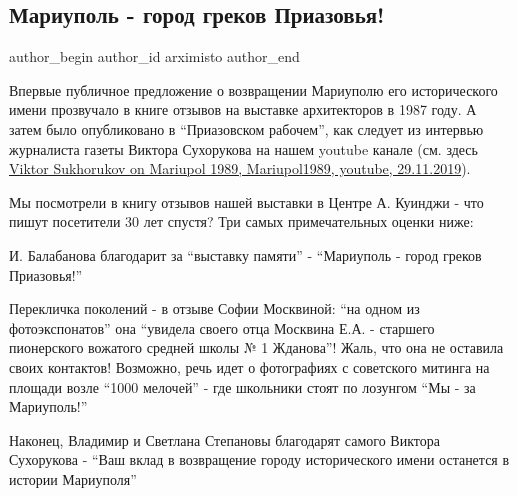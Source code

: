  
 
 
 
 

\subsection{Мариуполь - город греков Приазовья!}
\label{sec:15_12_2019.fb.arximisto.1.mariupol_gorod_grekov_priazovja}

\ifcmt
 author_begin
   author_id arximisto
 author_end
\fi

Впервые публичное предложение о возвращении Мариуполю его исторического имени
прозвучало в книге отзывов на выставке архитекторов в 1987 году. А затем было
опубликовано в \enquote{Приазовском рабочем}, как следует из интервью
журналиста газеты Виктора Сухорукова на нашем youtube канале (см. здесь
\href{https://archive.org/details/video.29_11_2019.mariupol1989.viktor_suhorukov_on_mariupol_1989}{%
Viktor Sukhorukov on Mariupol 1989, Mariupol1989, youtube, 29.11.2019}).

Мы посмотрели в книгу отзывов нашей выставки в Центре А. Куинджи - что пишут
посетители 30 лет спустя? Три самых примечательных оценки ниже:

И. Балабанова благодарит за \enquote{выставку памяти} - \enquote{Мариуполь - город греков Приазовья!}

Перекличка поколений - в отзыве Софии Москвиной: \enquote{на одном из фотоэкспонатов}
она \enquote{увидела своего отца Москвина Е.А. - старшего пионерского вожатого средней
школы № 1 Жданова}! Жаль, что она не оставила своих контактов! Возможно, речь
идет о фотографиях с советского митинга на площади возле \enquote{1000 мелочей} - где
школьники стоят по лозунгом \enquote{Мы - за Мариуполь!}

Наконец, Владимир и Светлана Степановы благодарят самого Виктора Сухорукова -
\enquote{Ваш вклад в возвращение городу исторического имени останется в истории
Мариуполя} 🙂


